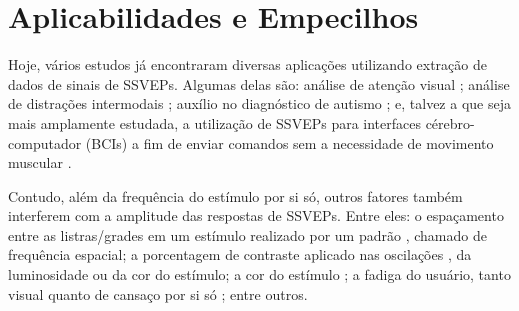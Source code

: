 \section{Aplicabilidades e Empecilhos}

Hoje, vários estudos já encontraram diversas aplicações utilizando extração de dados de sinais de SSVEPs. Algumas delas são: análise de atenção visual \cite{Muller2006}; análise de distrações intermodais \cite{Heim2019}; auxílio no diagnóstico de autismo \cite{Belmonte2000}; e, talvez a que seja mais amplamente estudada, a utilização de SSVEPs para interfaces cérebro-computador (BCIs) a fim de enviar comandos sem a necessidade de movimento muscular \cite{Wang2006, Sakurada2015, Wang2017}.

Contudo, além da frequência do estímulo por si só, outros fatores também interferem com a amplitude das respostas de SSVEPs. Entre eles: o espaçamento entre as listras/grades em um estímulo realizado por um padrão \cite{Regan1978}, chamado de frequência espacial; a porcentagem de contraste aplicado nas oscilações \cite{Regan1978}, da luminosidade ou da cor do estímulo; a cor do estímulo \cite{GodinezTello2015, Parra2007}; a fadiga do usuário, tanto visual quanto de cansaço por si só \cite{Zhang2019, Chang2014}; entre outros.